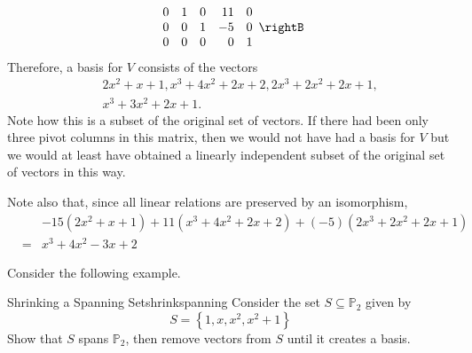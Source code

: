 \begin{solution}
\begin{equation*}
\begin{array}{rrrrr}
0 & 1 & 0 & 11 & 0 \\ 
0 & 0 & 1 & -5 & 0 \\ 
0 & 0 & 0 & 0 & 1
\end{array}
\rightB
\end{equation*}
Therefore, a basis for $V$ consists of the vectors
\begin{eqnarray*}
&&2x^{2}+x+1,x^{3}+4x^{2}+2x+2,2x^{3}+2x^{2}+2x+1, \\
&&x^{3}+3x^{2}+2x+1.
\end{eqnarray*}
Note how this is a subset of the original set of vectors. If there had been
only three pivot columns in this matrix, then we would not have had a basis
for $V$ but we would at least have obtained a linearly independent subset of
the original set of vectors in this way. 

Note also that, since all linear relations are preserved by an isomorphism,
\begin{eqnarray*}
&&-15\left( 2x^{2}+x+1\right) +11\left( x^{3}+4x^{2}+2x+2\right) +\left(
-5\right) \left( 2x^{3}+2x^{2}+2x+1\right) \\
&=&x^{3}+4x^{2}-3x+2
\end{eqnarray*}

\end{solution}

Consider the following example.

\begin{example}{Shrinking a Spanning Set}{shrinkspanning}
Consider the set $S \subseteq \mathbb{P}_2$ given by 
\[
S = \left\{ 1, x, x^2, x^2 + 1 \right\}
\]
Show that $S$ spans $\mathbb{P}_2$, then remove vectors from $S$ until it creates a basis. 
\end{example}

